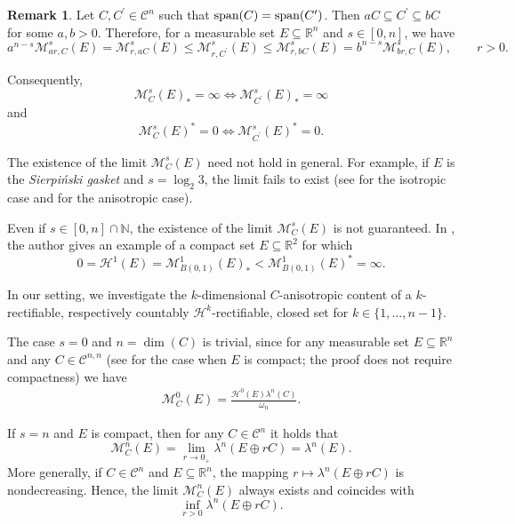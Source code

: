 \documentclass[pdflatex,sn-mathphys-num]{sn-jnl}
\theoremstyle{plain}
\theoremstyle{definition}
\newtheorem{rem}[theorem]{Remark}
\DeclareMathOperator{\LO}{\textup{span}}
\begin{document}
\begin{rem}\label{0inf}
    Let $C, C^{\prime}\in\mathcal{C}^n$ such that $\LO(C)=\LO(C^{\prime})$. Then $aC\subseteq C^{\prime}\subseteq bC$ for some $a, b>0$. Therefore, for a measurable set $E\subseteq\mathbb{R}^n$ and $s\in [0, n]$, we have $$a^{n-s}\mathcal{M}^s_{ar, C}(E)=\mathcal{M}^s_{r, aC}(E)\leq\mathcal{M}^s_{r, C^{\prime}}(E)\leq\mathcal{M}^s_{r, bC}(E)=b^{n-s}\mathcal{M}^s_{br, C}(E),\qquad r>0.$$ 

    Consequently, $$\mathcal{M}^s_{C}(E)_*=\infty \iff \mathcal{M}^s_{C^{\prime}}(E)_*=\infty$$ and $$\mathcal{M}^s_{C}(E)^*=0 \iff \mathcal{M}^s_{C^{\prime}}(E)^*=0.$$
\end{rem}

    The existence of the limit $\mathcal{M}^s_{C}(E)$ need not hold in general. For example, if $E$ is the \emph{Sierpi\'nski gasket} and $s=\log_2 3$, the limit fails to exist (see \cite[Example 3.3]{Rataj} for the isotropic case and \cite[Example 3.7]{frys2} for the anisotropic case).

    Even if $s\in [0, n]\cap \mathbb{N}$, the existence of the limit $\mathcal{M}^s_{C}(E)$ is not guaranteed. In \cite[3.2.40]{federer}, the author gives an example of a compact set $E\subseteq\mathbb{R}^2$ for which $$0=\mathcal{H}^1(E)=\mathcal{M}^1_{B(0,1)}(E)_*<\mathcal{M}^1_{B(0,1)}(E)^*=\infty.$$

   In our setting, we investigate the $k$-dimensional $C$-anisotropic content of a 
$k$-rectifiable, respectively countably $\mathcal{H}^k$-rectifiable, closed set 
for $k\in\{1, \dots, n-1\}$. 

The case $s=0$ and $n=\dim(C)$ is trivial, since for any measurable
set $E\subseteq\mathbb{R}^n$ and any $C\in\mathcal{C}^{n, n}$ (see \cite[Lemma~2.6]{frys2} for the case when $E$ is compact; the proof does not require compactness) we have
\begin{align}\label{0n}
    \mathcal{M}^0_{C}(E) = \frac{\mathcal{H}^0(E)\lambda^n(C)}{\omega_n}.
\end{align}

If $s=n$ and $E$ is compact, then for any $C\in\mathcal{C}^{n}$ it holds that \cite[Lemma~2.6]{frys2} $$\mathcal{M}^n_{C}(E)=\lim_{r\to0_+}\lambda^n(E\oplus rC)=\lambda^n(E).$$ More generally, if $C\in\mathcal{C}^{n}$ and $E\subseteq\mathbb{R}^n$, the mapping $r\mapsto \lambda^{n}(E\oplus rC)$ is nondecreasing. Hence, the limit $\mathcal{M}^n_C(E)$ always exists and coincides with $$\inf_{r>0}\lambda^{n}(E\oplus rC).$$
\end{document}
